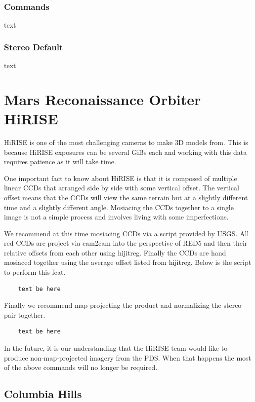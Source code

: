 \subsubsection*{Commands}

text

\subsubsection*{Stereo Default}

text

\section{Mars Reconaissance Orbiter HiRISE}

HiRISE is one of the most challenging cameras to make 3D models
from. This is because HiRISE exposures can be several GiBs each and
working with this data requires patience as it will take time.

One important fact to know about HiRISE is that it is composed of
multiple linear CCDs that arranged side by side with some vertical
offset. The vertical offset means that the CCDs will view the same
terrain but at a slightly different time and a slightly different
angle. Mosiacing the CCDs together to a single image is not a simple
process and involves living with some imperfections.

We recommend at this time mosiacing CCDs via a script provided by
USGS. All red CCDs are project via cam2cam into the perspective of
RED5 and then their relative offsets from each other using
hijitreg. Finally the CCDs are hand mosiaced together using the
average offset listed from hijitreg. Below is the script to perform
this feat.

\begin{verbatim}
    text be here
\end{verbatim}

Finally we recommend map projecting the product and normalizing the
stereo pair together.

\begin{verbatim}
    text be here
\end{verbatim}

In the future, it is our understanding that the HiRISE team would like
to produce non-map-projected imagery from the PDS. When that happens
the most of the above commands will no longer be required.

\subsection{Columbia Hills}

